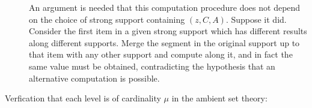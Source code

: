 \documentclass[12pt]{article}
\begin{document}
\begin{description}
An argument is needed that this computation procedure does not depend on the choice of strong support containing $(z,C,A)$.  Suppose it did.  Consider the first item in a given strong support which has different results along different supports.  Merge the segment in the original support up to that item with any other support and compute along it, and in fact
the same value must be obtained, contradicting the hypothesis that an alternative computation is possible.

\item[Verfication that each level is of cardinality $\mu$ in the ambient set theory:]





\end{description}
\end{document}
